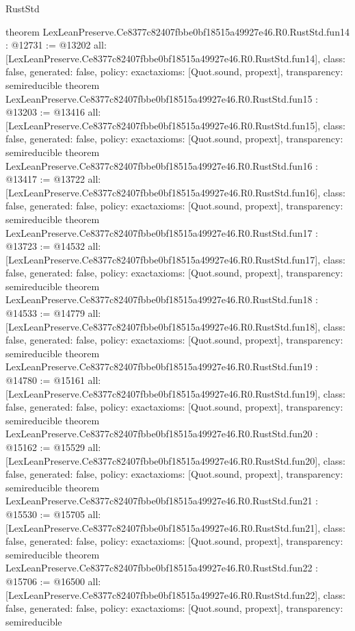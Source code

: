 \begin{lexlean}{RustStd}
\begin{coremodule}
{}
theorem LexLeanPreserve.Ce8377c82407fbbe0bf18515a49927e46.R0.RustStd.fun14 : @12731 := @13202 {
  all: [LexLeanPreserve.Ce8377c82407fbbe0bf18515a49927e46.R0.RustStd.fun14],
  class: false,
  generated: false,
  policy: exact{axioms: [Quot.sound, propext]},
  transparency: semireducible
}
theorem LexLeanPreserve.Ce8377c82407fbbe0bf18515a49927e46.R0.RustStd.fun15 : @13203 := @13416 {
  all: [LexLeanPreserve.Ce8377c82407fbbe0bf18515a49927e46.R0.RustStd.fun15],
  class: false,
  generated: false,
  policy: exact{axioms: [Quot.sound, propext]},
  transparency: semireducible
}
theorem LexLeanPreserve.Ce8377c82407fbbe0bf18515a49927e46.R0.RustStd.fun16 : @13417 := @13722 {
  all: [LexLeanPreserve.Ce8377c82407fbbe0bf18515a49927e46.R0.RustStd.fun16],
  class: false,
  generated: false,
  policy: exact{axioms: [Quot.sound, propext]},
  transparency: semireducible
}
theorem LexLeanPreserve.Ce8377c82407fbbe0bf18515a49927e46.R0.RustStd.fun17 : @13723 := @14532 {
  all: [LexLeanPreserve.Ce8377c82407fbbe0bf18515a49927e46.R0.RustStd.fun17],
  class: false,
  generated: false,
  policy: exact{axioms: [Quot.sound, propext]},
  transparency: semireducible
}
theorem LexLeanPreserve.Ce8377c82407fbbe0bf18515a49927e46.R0.RustStd.fun18 : @14533 := @14779 {
  all: [LexLeanPreserve.Ce8377c82407fbbe0bf18515a49927e46.R0.RustStd.fun18],
  class: false,
  generated: false,
  policy: exact{axioms: [Quot.sound, propext]},
  transparency: semireducible
}
theorem LexLeanPreserve.Ce8377c82407fbbe0bf18515a49927e46.R0.RustStd.fun19 : @14780 := @15161 {
  all: [LexLeanPreserve.Ce8377c82407fbbe0bf18515a49927e46.R0.RustStd.fun19],
  class: false,
  generated: false,
  policy: exact{axioms: [Quot.sound, propext]},
  transparency: semireducible
}
theorem LexLeanPreserve.Ce8377c82407fbbe0bf18515a49927e46.R0.RustStd.fun20 : @15162 := @15529 {
  all: [LexLeanPreserve.Ce8377c82407fbbe0bf18515a49927e46.R0.RustStd.fun20],
  class: false,
  generated: false,
  policy: exact{axioms: [Quot.sound, propext]},
  transparency: semireducible
}
theorem LexLeanPreserve.Ce8377c82407fbbe0bf18515a49927e46.R0.RustStd.fun21 : @15530 := @15705 {
  all: [LexLeanPreserve.Ce8377c82407fbbe0bf18515a49927e46.R0.RustStd.fun21],
  class: false,
  generated: false,
  policy: exact{axioms: [Quot.sound, propext]},
  transparency: semireducible
}
theorem LexLeanPreserve.Ce8377c82407fbbe0bf18515a49927e46.R0.RustStd.fun22 : @15706 := @16500 {
  all: [LexLeanPreserve.Ce8377c82407fbbe0bf18515a49927e46.R0.RustStd.fun22],
  class: false,
  generated: false,
  policy: exact{axioms: [Quot.sound, propext]},
  transparency: semireducible
}
\end{coremodule}
\end{lexlean}
